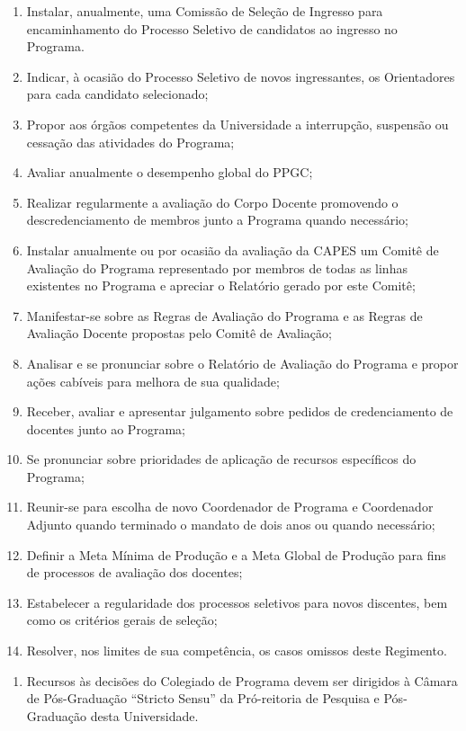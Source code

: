 \documentclass{article}
\newcommand{\singleitem}{\item[Parágrafo Único.]}
\begin{document}
\begin{enumerate}
\begin{enumerate}[label=\Roman*]
		\item Instalar, anualmente, uma Comissão de Seleção de Ingresso para encaminhamento do Processo Seletivo de candidatos ao ingresso no Programa.
		\item Indicar, à ocasião do Processo Seletivo de novos ingressantes, os Orientadores para cada candidato selecionado; %
		\item Propor aos órgãos competentes da Universidade a interrupção, suspensão ou cessação das atividades do Programa;
		\item Avaliar anualmente o desempenho global do PPGC;
		\item Realizar regularmente a avaliação do Corpo Docente promovendo o descredenciamento de membros junto a Programa quando necessário;
		\item Instalar anualmente ou por ocasião da avaliação da CAPES um Comitê de Avaliação do Programa representado por membros de todas as linhas existentes no Programa e apreciar o Relatório gerado por este Comitê; 
		\item Manifestar-se sobre as Regras de Avaliação do Programa e as Regras de Avaliação Docente propostas pelo Comitê de Avaliação;
		\item Analisar e se pronunciar sobre o Relatório de Avaliação do Programa e propor ações cabíveis para melhora de sua qualidade;
		\item Receber, avaliar e apresentar julgamento sobre pedidos de credenciamento de docentes junto ao Programa;
		\item Se pronunciar sobre prioridades de aplicação de recursos específicos do Programa;
		\item Reunir-se para escolha de novo Coordenador de Programa e Coordenador Adjunto quando terminado o mandato de dois anos ou quando necessário; 

		\item Definir a Meta Mínima de Produção e a Meta Global de Produção para fins de processos de avaliação dos docentes;

		\item Estabelecer a regularidade dos processos seletivos para novos discentes, bem como os critérios gerais de seleção;

		\item Resolver, nos limites de sua competência, os casos omissos deste Regimento.
	\end{enumerate}
	\begin{enumerate}
		\singleitem Recursos às decisões do Colegiado de Programa devem ser dirigidos à Câmara de Pós-Graduação ``Stricto Sensu'' da Pró-reitoria de Pesquisa e Pós-Graduação desta Universidade.
	\end{enumerate}
\end{enumerate}
\end{document}
